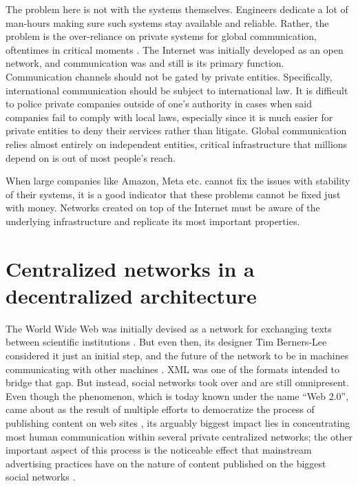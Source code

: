 \documentclass{article}
\begin{document}
The problem here is not with the systems themselves. Engineers dedicate a lot of man-hours making sure such systems stay available and reliable. Rather, the problem is the over-reliance on private systems for global communication, oftentimes in critical moments \cite{Davies}. The
Internet was initially developed as an open network, and communication was and still is its primary
function. Communication channels should not be gated by private entities. Specifically,
international communication should be subject to international law. It is difficult to police private
companies outside of one’s authority in cases when said companies fail to comply with local laws,
especially since it is much easier for private entities to deny their services rather than litigate.
Global communication relies almost entirely on independent entities, critical infrastructure that
millions depend on is out of most people’s reach.

When large companies like Amazon, Meta etc. cannot fix the issues with stability of their
systems, it is a good indicator that these problems cannot be fixed just with money. Networks
created on top of the Internet must be aware of the underlying infrastructure and replicate its most
important properties.

\section*{Centralized networks in a decentralized architecture}

The World Wide Web was initially devised as a network for exchanging texts between
scientific institutions \cite{Lee1}. But even then, its designer Tim Berners-Lee considered it just an initial
step, and the future of the network to be in machines communicating with other machines \cite{Lee2}.
XML was one of the formats intended to bridge that gap. But instead, social networks took over
and are still omnipresent. Even though the phenomenon, which is today known under the name
“Web 2.0”, came about as the result of multiple efforts to democratize the process of publishing
content on web sites \cite{Sykora}, its arguably biggest impact lies in concentrating most human
communication within several private centralized networks; the other important aspect of this
process is the noticeable effect that mainstream advertising practices have on the nature of content
published on the biggest social networks \cite{Walter}.
\end{document}
